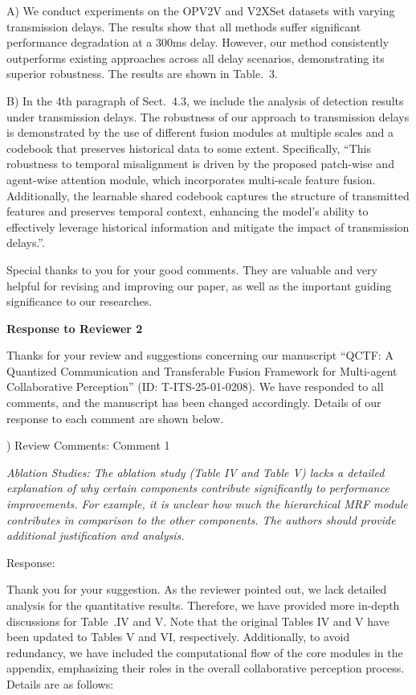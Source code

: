 \documentclass[12pt,a4paper]{article}
\begin{document}
A) We conduct experiments on the OPV2V and V2XSet datasets with varying transmission delays. The results show that all methods suffer significant performance degradation at a 300ms delay. However, our method consistently outperforms existing approaches across all delay scenarios, demonstrating its superior robustness. The results are shown in Table.~3.


B) In the 4th paragraph of Sect.~4.3, we include the analysis of detection results under transmission delays. The robustness of our approach to transmission delays is demonstrated by the use of different fusion modules at multiple scales and a codebook that preserves historical data to some extent. Specifically, ``This robustness to temporal misalignment is driven by the proposed patch-wise and agent-wise attention module, which incorporates multi-scale feature fusion. Additionally, the learnable shared codebook captures the structure of transmitted features and preserves temporal context, enhancing the model's ability to effectively leverage historical information and mitigate the impact of transmission delays.''.

\vspace{6ex}
Special thanks to you for your good comments. They are valuable and very helpful for revising and improving our paper, as well as the important guiding significance to our researches.



\clearpage
\noindent \textbf{ Response to Reviewer 2}

Thanks for your review and suggestions concerning our manuscript ``QCTF: A Quantized Communication and Transferable Fusion Framework for Multi-agent Collaborative Perception'' (ID: T-ITS-25-01-0208). We have responded to all comments, and the manuscript has been changed accordingly. Details of our response to each comment are shown below.

\vspace{4ex}
) Review Comments: Comment 1

\textit{Ablation Studies: The ablation study (Table IV and Table V) lacks a detailed explanation of why certain components contribute significantly to performance improvements. For example, it is unclear how much the hierarchical MRF module contributes in comparison to the other components. The authors should provide additional justification and analysis.}

\noindent Response:

Thank you for your suggestion. As the reviewer pointed out, we lack detailed analysis for the quantitative results. Therefore, we have provided more in-depth discussions for Table~.IV and V.
Note that the original Tables IV and V have been updated to Tables V and VI, respectively.
Additionally, to avoid redundancy, we have included the computational flow of the core modules in the appendix, emphasizing their roles in the overall collaborative perception process.
Details are as follows:
\end{document}
